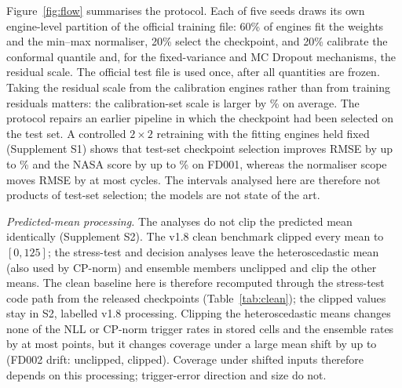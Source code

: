Figure~\ref{fig:flow} summarises the protocol. Each of five seeds draws its own engine-level partition of the official training file: 60\% of engines fit the weights and the min--max normaliser, 20\% select the checkpoint, and 20\% calibrate the conformal quantile and, for the fixed-variance and MC Dropout mechanisms, the residual scale. The official test file is used once, after all quantities are frozen. Taking the residual scale from the calibration engines rather than from training residuals matters: the calibration-set scale is larger by \NFairRatio\% on average. The protocol repairs an earlier pipeline in which the checkpoint had been selected on the test set. A controlled $2\times2$ retraining with the fitting engines held fixed (Supplement S1) shows that test-set checkpoint selection improves RMSE by up to \NLeakRMSEmax\% and the NASA score by up to \NLeakScoremax\% on FD001, whereas the normaliser scope moves RMSE by at most \NNormAbsMaxRMSE{} cycles. The intervals analysed here are therefore not products of test-set selection; the models are not state of the art.

\emph{Predicted-mean processing.} The analyses do not clip the predicted mean identically (Supplement S2). The v1.8 clean benchmark clipped every mean to $[0,125]$; the stress-test and decision analyses leave the heteroscedastic mean (also used by CP-norm) and ensemble members unclipped and clip the other means. The clean baseline here is therefore recomputed through the stress-test code path from the released checkpoints (Table~\ref{tab:clean}); the clipped values stay in S2, labelled v1.8 processing. Clipping the heteroscedastic means changes none of the NLL or CP-norm trigger rates in \JClipRateN{} stored cells and the ensemble rates by at most \JClipRateMaxEns{} points, but it changes coverage under a large mean shift by up to \JClipPICPmaxDrift{} (FD002 drift: \JClipDriftTwoU{} unclipped, \JClipDriftTwoA{} clipped). Coverage under shifted inputs therefore depends on this processing; trigger-error direction and size do not.

